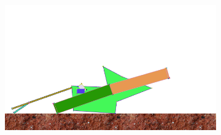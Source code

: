\begin{figure}[H]
\begin{subfigure}[b]{0.3\textwidth}
          \caption{\label{fig:ruder_2}}
        \end{subfigure}
        \hspace{\fill}
        \begin{subfigure}[b]{0.3\textwidth}
          \includegraphics[width=\linewidth,center]{graphics/simulation-discussion/ruder_3}
          \caption{\label{fig:ruder_3}}
        \end{subfigure}


\end{figure}
